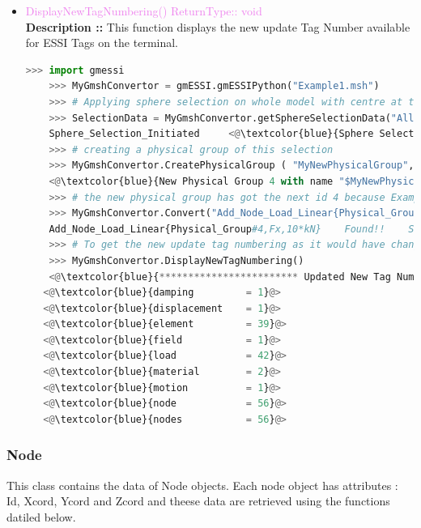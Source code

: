 \documentclass[11pt]{article}
\begin{document}
\begin{itemize}
    \item \textcolor{violet}{ DisplayNewTagNumbering() \hfill {ReturnType:: void}} \\
    \textbf{Description ::} This function displays the new update Tag Number available for ESSI Tags on the terminal.
    \begin{lstlisting}[language=Python]
    >>> import gmessi
    >>> MyGmshConvertor = gmESSI.gmESSIPython("Example1.msh")
    >>> # Applying sphere selection on whole model with centre at the cente of the model (2,0.5,0.5) and radius as 2 units
    >>> SelectionData = MyGmshConvertor.getSphereSelectionData("All",2,2,0.5,0.5)
    Sphere_Selection_Initiated     <@\textcolor{blue}{Sphere Selection Made over All Model with radius 2 and center at 2 0.5 0.5}@>
    >>> # creating a physical group of this selection
    >>> MyGmshConvertor.CreatePhysicalGroup ( "MyNewPhysicalGroup", SelectionData.NodeList, SelectionData.ElementList)
    <@\textcolor{blue}{New Physical Group 4 with name "$MyNewPhysicalGroup$" created}@>
    >>> # the new physical group has got the next id 4 because Example1.msh had the last physical group with id 3. The user can use the new created physical group.
    >>> MyGmshConvertor.Convert("Add_Node_Load_Linear{Physical_Group#4,Fx,10*kN}")
    Add_Node_Load_Linear{Physical_Group#4,Fx,10*kN}    Found!!    Sucessfully Converted
    >>> # To get the new update tag numbering as it would have changed by the execution of the above gmESSI command
    >>> MyGmshConvertor.DisplayNewTagNumbering()
    <@\textcolor{blue}{************************ Updated New Tag Numberring *********************}@>
   <@\textcolor{blue}{damping         = 1}@>
   <@\textcolor{blue}{displacement    = 1}@>
   <@\textcolor{blue}{element         = 39}@>
   <@\textcolor{blue}{field           = 1}@>
   <@\textcolor{blue}{load            = 42}@>
   <@\textcolor{blue}{material        = 2}@>
   <@\textcolor{blue}{motion          = 1}@>
   <@\textcolor{blue}{node            = 56}@>
   <@\textcolor{blue}{nodes           = 56}@>
    \end{lstlisting}

\end{itemize}

\subsubsection{Node}
This class contains the data of Node objects. Each node object has attributes : Id, Xcord, Ycord and Zcord and theese data are retrieved using the functions datiled below.
\end{document}
